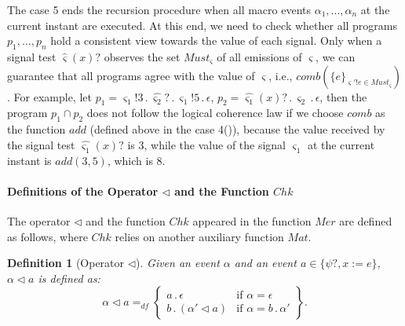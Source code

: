 \documentclass{fcs}
\newtheorem{mydef}{Definition}[section]
\newcommand{\rmn}[1]{(\romannumeral#1)}
\newcommand{\sig}[0]{\varsigma}
\DeclareMathOperator{\seq}{;}
\DeclareMathOperator{\para}{\cap}
\newcommand{\Must}[0]{\mathit{Must}}
\newcommand{\Cannot}[0]{\mathit{Cant}}
\newcommand{\Chk}[0]{\mathit{Chk}}
\newcommand{\Match}[0]{\mathit{Mat}}
\DeclareMathOperator{\nex}{.}
\newcommand{\Merge}[0]{\mathit{Mer}}
\newcommand{\append}[0]{\triangleleft}
\newcommand{\comb}[0]{\mathit{comb}}
\newcommand{\Sigs}[0]{\mathit{Sig}}
\newcommand{\SV}[0]{\Xi}
\newcommand{\dddef}[0]{=_{df}}
\begin{document}
The case 5 ends the recursion procedure when all macro events $\alpha_1,...,\alpha_n$ at the current instant are executed. %
 At this end, we need to check whether all programs $p_1,...,p_n$ hold a consistent view towards the value of each signal.
Only when a signal test $\hat{\sig}(x)?$ observes the set $\Must_\sig$ of all emissions of $\sig$, we can guarantee that
  all programs agree with the value of $\sig$, i.e., $\comb(\{e\}_{\sig'!e\in \Must_\sig})$.
For example, let $p_1 = \sig_1!3\nex \hat{\sig_2}?\nex \sig_1!5\nex \epsilon$, $p_2 = \hat{\sig_1}(x)?\nex \sig_2\nex \epsilon$,
then the program $p_1\para p_2$ does not follow the logical coherence law if we choose $\comb$ as the function $\mathit{add}$ (defined above in the case 4\rmn{1}),
because the value received by the signal test $\hat{\sig_1}(x)?$ is $3$, while the value of the signal $\sig_1$ at the current instant is $\mathit{add}(3,5)$, which is $8$.

\ifx
\paragraph{Definitions of the Operator $\append$ and the Function $\Chk$}
The operator $\append$ and the function $\Chk$ appeared in the function $\Merge$ are defined as follows, where $\Chk$ relies on another auxiliary function $\Match$.

\begin{mydef}[Operator $\append$]
\label{label:Operator append}
    Given an event $\alpha$ and an event $a \in \{\psi?, x:=e\}$,
    $\alpha\append a$ is defined as:
    $$\alpha\append a\dddef \left\{
    \begin{array}{ll}
    a\nex \epsilon & \mbox{if $\alpha = \epsilon$}\\
    b\nex (\alpha'\append a) &\mbox{if $\alpha = b\nex \alpha'$}
    \end{array}
    \right\}.$$
\end{mydef}
\end{document}
